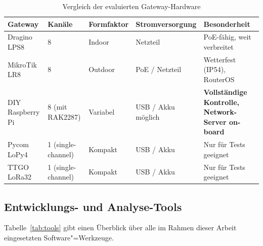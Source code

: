 \begin{table}[htbp]
    \centering
    \caption{Vergleich der evaluierten Gateway-Hardware}
    \label{tab:gateway_vergleich}
    \begin{tabularx}{\textwidth}{l X X X X}
        \toprule
        \textbf{Gateway}
            & \textbf{Kanäle}
            & \textbf{Formfaktor}
            & \textbf{Stromversorgung}
            & \textbf{Besonderheit} \\
        \midrule
        Dragino LPS8
            & 8
            & Indoor
            & Netzteil
            & PoE-fähig, weit verbreitet \\
        \addlinespace
        MikroTik LR8
            & 8
            & Outdoor
            & PoE / Netzteil
            & Wetterfest (IP54), RouterOS \\
        \addlinespace
        DIY Raspberry Pi
            & 8 (mit RAK2287)
            & Variabel
            & USB / Akku möglich
            & \textbf{Vollständige Kontrolle,}
              \textbf{Network-Server on-board} \\
        \addlinespace
        Pycom LoPy4
            & 1 (single-channel)
            & Kompakt
            & USB / Akku
            & Nur für Tests geeignet \\
        \addlinespace
        TTGO LoRa32
            & 1 (single-channel)
            & Kompakt
            & USB / Akku
            & Nur für Tests geeignet \\
        \bottomrule
    \end{tabularx}
\end{table}

\subsection{Entwicklungs- und Analyse-Tools}
\label{subsec:tools}

Tabelle~\ref{tab:tools} gibt einen Überblick über alle im Rahmen dieser Arbeit
eingesetzten Software"=Werkzeuge.

